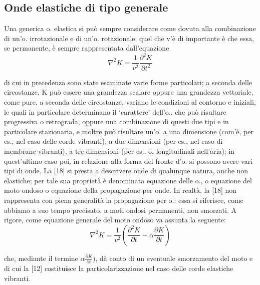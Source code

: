 \documentclass[a4paper]{article}
\begin{document}
\subsection{Onde elastiche di tipo generale}
Una generica o. elastica si può sempre considerare come dovuta alla combinazione di un'o. irrotazionale e di un'o. rotazionale; quel che v'è di importante è che essa, se permanente, è sempre rappresentata dall'equazione 
\begin{equation}
\nabla^2 K = \frac{1}{v^2}\frac{\partial^2 K}{\partial t^2}
\end{equation}

di cui in precedenza sono state esaminate varie forme particolari; a seconda delle circostanze, K può essere una grandezza scalare oppure una grandezza vettoriale, come pure, a seconda delle circostanze, variano le condizioni al contorno e iniziali, le quali in particolare determinano il ‘carattere' dell'o., che può risultare progressiva o retrograda, oppure una combinazione di questi due tipi e in particolare stazionaria, e inoltre può risultare un'o. a una dimensione (com'è, per es., nel caso delle corde vibranti), a due dimensioni (per es., nel caso di membrane vibranti), a tre dimensioni (per es., o. longitudinali nell'aria); in quest'ultimo caso poi, in relazione alla forma del fronte d'o. si possono avere vari tipi di onde. La [18] si presta a descrivere onde di qualunque natura, anche non elastiche; per tale sua proprietà è denominata equazione delle o., o equazione del moto ondoso o equazione della propagazione per onde. In realtà, la [18] non rappresenta con piena generalità la propagazione per o.: essa si riferisce, come abbiamo a suo tempo precisato, a moti ondosi permanenti, non smorzati. A rigore, come equazione generale del moto ondoso va assunta la seguente:
\begin{equation}
\nabla^2 K=\frac{1}{v^2}(\frac{\partial^2 K}{\partial t}+\alpha\frac{\partial K}{\partial t})
\end{equation}

che, mediante il termine $\alpha\frac{\partial K}{\partial t})$, dà conto di un eventuale smorzamento del moto e di cui la [12] costituisce la particolarizzazione nel caso delle corde elastiche vibranti.
\end{document}
